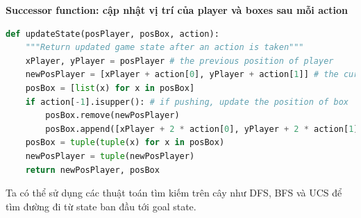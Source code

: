 \documentclass[12pt]{article}
\begin{document}
\begin{itemize}
	\noindent \hspace*{-1em}\textbf{
		Successor function: cập nhật vị trí của player và boxes sau mỗi action}
	\begin{tcolorbox}[boxrule=0.5pt, colback=white]
		\begin{lstlisting}[language=python, numbers=none, basicstyle=\ttfamily\footnotesize]		
def updateState(posPlayer, posBox, action):
	"""Return updated game state after an action is taken"""
	xPlayer, yPlayer = posPlayer # the previous position of player
	newPosPlayer = [xPlayer + action[0], yPlayer + action[1]] # the current position of player
	posBox = [list(x) for x in posBox]
	if action[-1].isupper(): # if pushing, update the position of box
		posBox.remove(newPosPlayer)
		posBox.append([xPlayer + 2 * action[0], yPlayer + 2 * action[1]])
	posBox = tuple(tuple(x) for x in posBox)
	newPosPlayer = tuple(newPosPlayer)
	return newPosPlayer, posBox
		\end{lstlisting}
		\end{tcolorbox}

\end{itemize}

\vspace{1em}
\text{\Huge $\Rightarrow$} Ta có thể sử dụng các thuật toán tìm kiếm trên cây như
DFS, BFS và UCS để tìm \phantom{abcdèfd} đường đi từ state ban đầu tới goal state.
\end{document}
